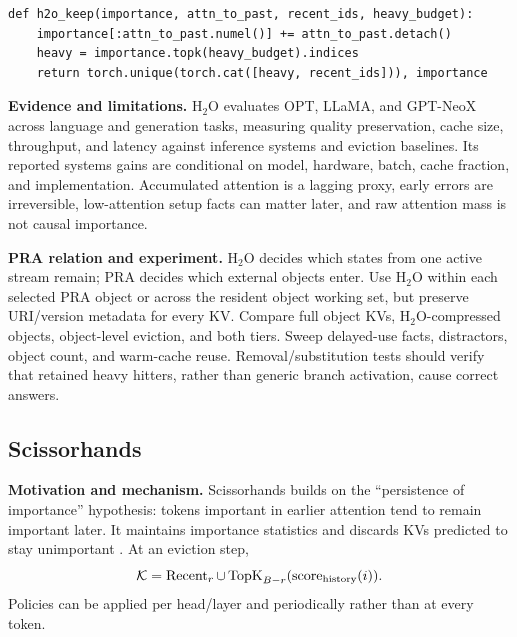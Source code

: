\begin{lstlisting}[caption={Educational heavy-hitter update}]
def h2o_keep(importance, attn_to_past, recent_ids, heavy_budget):
    importance[:attn_to_past.numel()] += attn_to_past.detach()
    heavy = importance.topk(heavy_budget).indices
    return torch.unique(torch.cat([heavy, recent_ids])), importance
\end{lstlisting}

\textbf{Evidence and limitations.} H$_2$O evaluates OPT, LLaMA, and GPT-NeoX across language
and generation tasks, measuring quality preservation, cache size, throughput, and latency
against inference systems and eviction baselines.  Its reported systems gains are conditional
on model, hardware, batch, cache fraction, and implementation.  Accumulated attention is a
lagging proxy, early errors are irreversible, low-attention setup facts can matter later,
and raw attention mass is not causal importance.

\textbf{PRA relation and experiment.} H$_2$O decides which states from one active stream
remain; PRA decides which external objects enter.  Use H$_2$O within each selected PRA object
or across the resident object working set, but preserve URI/version metadata for every KV.
Compare full object KVs, H$_2$O-compressed objects, object-level eviction, and both tiers.
Sweep delayed-use facts, distractors, object count, and warm-cache reuse.  Removal/substitution
tests should verify that retained heavy hitters, rather than generic branch activation,
cause correct answers.

\subsection{Scissorhands}

\textbf{Motivation and mechanism.} Scissorhands builds on the ``persistence of importance''
hypothesis: tokens important in earlier attention tend to remain important later.  It
maintains importance statistics and discards KVs predicted to stay unimportant
\citep{liu2023scissorhands}.  At an eviction step,
\begin{equation}
\mathcal K=\operatorname{Recent}_r\cup
\operatorname{TopK}_{B-r}(\operatorname{score}_{\rm history}(i)).
\end{equation}
Policies can be applied per head/layer and periodically rather than at every token.

